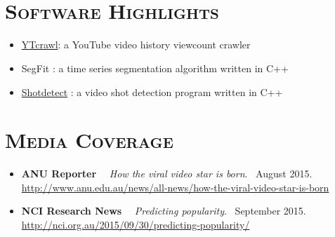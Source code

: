 \begin{resume}
\begin{formatb}
  \\
  \body\\
\end{formatb}

\section{\textsc{Software Highlights}}
\begin{itemize}
\item \href{https://github.com/yuhonglin/YTCrawl}{YTcrawl}: a YouTube video history viewcount crawler
\item SegFit : a time series segmentation algorithm written in C++
\item \href{https://github.com/yuhonglin/shotdetect}{Shotdetect} : a video shot detection program written in C++
\end{itemize}

\section{\textsc{Media Coverage}}
\begin{itemize}
  \item {\bf ANU Reporter} \ \ {\it How the viral video star is born}. \ August 2015.\\
    \url{http://www.anu.edu.au/news/all-news/how-the-viral-video-star-is-born}
  \item {\bf NCI Research News} \ \ {\it Predicting popularity}. \ September 2015.\\
    \url{http://nci.org.au/2015/09/30/predicting-popularity/}
\end{itemize}



\end{resume}
